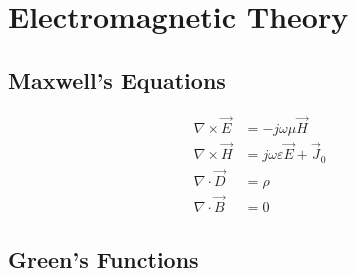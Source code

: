 \section{Electromagnetic Theory}

\subsection{Maxwell's Equations}

\begin{align}
	\nabla \times \vec{E} & = -j\omega\mu\vec{H} \\
	\nabla \times \vec{H} & = j\omega\varepsilon\vec{E} + \vec{J}_0 \\
	\nabla \cdot \vec{D} & = \rho \\
	\nabla \cdot \vec{B} & = 0
\end{align}

\subsection{Green's Functions}


